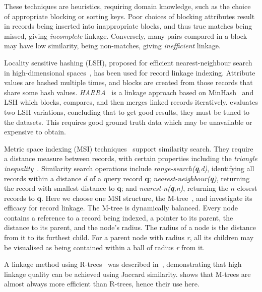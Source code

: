 \documentclass{llncs}
\begin{document}
These techniques are heuristics, requiring domain
knowledge, such as the choice of appropriate blocking or sorting keys.
Poor choices of blocking attributes result in records being inserted
into inappropriate blocks, and thus true matches being missed, giving \emph{incomplete} linkage.
Conversely, many pairs compared in a block may have low similarity, being non-matches, giving
\emph{inefficient} linkage.

Locality sensitive hashing (LSH), proposed for efficient
nearest-neighbour search in high-dimensional spaces~\cite{Ind98}, has
been used for record linkage indexing. Attribute
values are hashed multiple times, and blocks are created from those
records that share some hash values. \emph{HARRA}~\cite{Kim10} is a
linkage approach based on MinHash~\cite{Broder1997} and LSH
which blocks, compares, and then merges linked records iteratively. \cite{Steorts2014} evaluates two LSH variations, concluding
that to get good results, they must be tuned to the
datasets. This requires good ground
truth data which may be unavailable or expensive to obtain.

Metric space indexing (MSI) techniques~\cite{Zezula2010} support similarity search. 
They require
a distance measure between records, with certain properties including
the \emph{triangle inequality}~\cite{Zezula2010}. Similarity search
operations include \emph{range-search(\textbf{q},d)}, identifying all
records within a distance $d$
of a query record $\mathbf{q}$;
\emph{nearest-neighbour(\textbf{q})}, returning the record with smallest distance to $\mathbf{q}$; and
\emph{nearest-n(\textbf{q},n)}, returning the $n$ closest records to $\mathbf{q}$. Here we choose one MSI
structure, the M-tree~\cite{Ciaccia97indexingmetric}, and investigate
its efficacy for record linkage.
The M-tree is dynamically balanced. Every node contains
a reference to a record being indexed, a pointer to its parent, the
distance to its parent, and the node's radius. The radius of a node is
the distance from it to its furthest child. For a parent node with
radius \textit{r}, all its children may be visualised as being contained
within a ball of radius \textit{r} from it.

A linkage method using R-trees~\cite{Hjaltason1998}
was described in~\cite{Li2006}, demonstrating that high linkage
quality can be achieved using Jaccard similarity. \cite{Ciaccia97indexingmetric} shows that M-trees are
almost always more efficient than R-trees, hence their use here.

\end{document}
